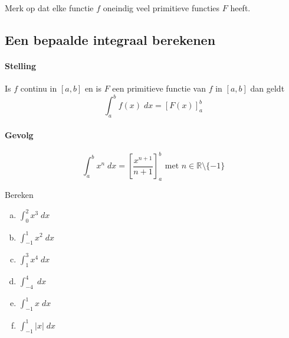 \documentclass[a4paper,12pt, twoside]{article}
\begin{document}
Merk op dat elke functie $f$ oneindig veel primitieve functies $F$ heeft.

\subsection{Een bepaalde integraal berekenen}

\paragraph{Stelling}

Is $f$ continu in $[a,b]$ en is $F$ een primitieve functie van $f$ in $[a,b]$ dan geldt
$$\int_a^b f(x)\;dx = [F(x)]_a^b$$

\paragraph*{Gevolg}
$$\int_a^b x^n\;dx = \left[\dfrac{x^{n+1}}{n+1}\right]_a^b \mbox{ met } n\in\mathbb{R}\setminus\{-1\}$$



\begin{oefening}
Bereken
\begin{multicols}{3}
\begin{enumerate}[(a)]
  \itemsep1em
  \item $\displaystyle \int_0^2 x^3 \;dx$
  \item $\displaystyle \int_{-1}^{1} x^2 \;dx$
  \item $\displaystyle \int_1^3 x^4 \;dx$
  \item $\displaystyle \int_{-4}^4 \;dx$
  \item $\displaystyle \int_{-1}^{1} x \;dx$
  \item $\displaystyle \int_{-1}^{1} |x| \;dx$
\end{enumerate}
\end{multicols}
\end{oefening}
\end{document}
